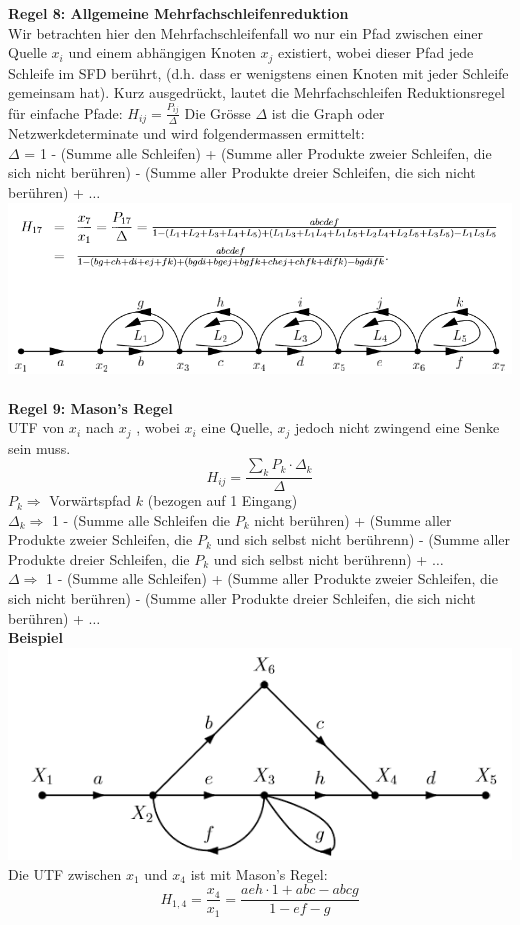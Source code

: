 \noindent\textbf{Regel 8: Allgemeine Mehrfachschleifenreduktion}\\
 Wir betrachten hier den Mehrfachschleifenfall wo nur ein Pfad
zwischen einer Quelle $x_i$ und einem abhängigen Knoten $x_j$
existiert, wobei dieser Pfad jede Schleife im SFD berührt, (d.h. 
dass er wenigstens einen Knoten mit jeder Schleife gemeinsam
hat). Kurz ausgedrückt, lautet die Mehrfachschleifen Reduktionsregel für 
einfache Pfade: $H_{ij} = \frac{P_{ij}}{\Delta}$
Die Grösse $\Delta$ ist die Graph oder Netzwerkdeterminate und wird folgendermassen ermittelt:~\\
$\Delta$  = 1 - (Summe alle Schleifen) + (Summe aller Produkte zweier Schleifen, die sich nicht berühren) - (Summe aller Produkte dreier Schleifen, die sich nicht berühren) + $\dots$
\includegraphics[width=\columnwidth]{Images/sfd_r8}~\\

\textbf{Regel 9: Mason's Regel}\\
UTF von $x_i$ nach $x_j$ , wobei $x_i$ eine Quelle, $x_j$ jedoch nicht zwingend eine Senke sein muss.
\[
H_{ij} = \frac{\sum_{k}P_k\cdot\Delta_k}{\Delta}
\]
$P_k \Rightarrow$ Vorwärtspfad $k$ (bezogen auf 1 Eingang)\\
$\Delta_k \Rightarrow $ 1 - (Summe alle Schleifen die $P_k$ nicht berühren) + (Summe aller Produkte zweier Schleifen, die $P_k$ und sich selbst nicht berührenn) - (Summe aller Produkte dreier Schleifen, die $P_k$ und sich selbst nicht berührenn) + $\dots$\\
$\Delta \Rightarrow $ 1 - (Summe alle Schleifen) + (Summe aller Produkte zweier Schleifen, die sich nicht berühren) - (Summe aller Produkte dreier Schleifen, die sich nicht berühren) + $\dots$\\

\textbf{Beispiel}\\
\includegraphics[width=\columnwidth]{Images/sfd_beispiel}
Die UTF zwischen $x_1$ und $x_4$ ist mit Mason's Regel:
\[
H_{1,4} = \frac{x_4}{x_1} = \frac{aeh \cdot 1 + abc - abcg}{1 - ef - g}
\]


